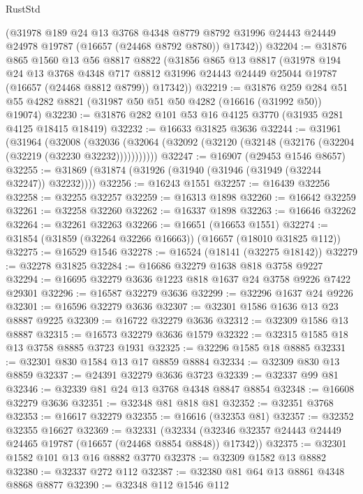 \begin{lexlean}{RustStd}
\begin{coremodule}
      (@31978
        @189
        @24
        @13
        @3768
        @4348
        @8779
        @8792
        @31996
        @24443
        @24449
        @24978
        @19787
        (@16657 (@24468 @8792 @8780))
        @17342))
@32204 := @31876
    @865
    @1560
    @13
    @56
    @8817
    @8822
    (@31856
      @865
      @13
      @8817
      (@31978
        @194
        @24
        @13
        @3768
        @4348
        @717
        @8812
        @31996
        @24443
        @24449
        @25044
        @19787
        (@16657 (@24468 @8812 @8799))
        @17342))
@32219 := @31876
    @259
    @284
    @51
    @55
    @4282
    @8821
    (@31987 @50 @51 @50 @4282 (@16616 (@31992 @50)) @19074)
@32230 := @31876 @282 @101 @53 @16 @4125 @3770 (@31935 @281 @4125 @18415 @18419)
@32232 := @16633 @31825 @3636
@32244 := @31961
    (@31964
      (@32008
        (@32036 (@32064 (@32092 (@32120 (@32148 (@32176 (@32204 (@32219 (@32230 @32232)))))))))))
@32247 := @16907 (@29453 @1546 @8657)
@32255 := @31869 (@31874 (@31926 (@31940 (@31946 (@31949 (@32244 @32247)) @32232))))
@32256 := @16243 @1551
@32257 := @16439 @32256
@32258 := @32255 @32257
@32259 := @16313 @1898
@32260 := @16642 @32259
@32261 := @32258 @32260
@32262 := @16337 @1898
@32263 := @16646 @32262
@32264 := @32261 @32263
@32266 := @16651 (@16653 @1551)
@32274 := @31854 (@31859 (@32264 @32266 @16663)) (@16657 (@18010 @31825 @112))
@32275 := @16529 @1546
@32278 := @16524 (@18141 (@32275 @18142))
@32279 := @32278 @31825
@32284 := @16686 @32279 @1638 @818 @3758 @9227
@32294 := @16695 @32279 @3636 @1223 @818 @1637 @24 @3758 @9226 @7422 @29301
@32296 := @16587 @32279 @3636
@32299 := @32296 @1637 @24 @9226
@32301 := @16596 @32279 @3636
@32307 := @32301 @1586 @1636 @13 @23 @8887 @9225
@32309 := @16722 @32279 @3636
@32312 := @32309 @1586 @13 @8887
@32315 := @16573 @32279 @3636 @1579
@32322 := @32315 @1585 @18 @13 @3758 @8885 @3723 @1931
@32325 := @32296 @1585 @18 @8885
@32331 := @32301 @830 @1584 @13 @17 @8859 @8884
@32334 := @32309 @830 @13 @8859
@32337 := @24391 @32279 @3636 @3723
@32339 := @32337 @99 @81
@32346 := @32339 @81 @24 @13 @3768 @4348 @8847 @8854
@32348 := @16608 @32279 @3636
@32351 := @32348 @81 @818 @81
@32352 := @32351 @3768
@32353 := @16617 @32279
@32355 := @16616 (@32353 @81)
@32357 := @32352 @32355 @16627
@32369 := @32331
    (@32334 (@32346 @32357 @24443 @24449 @24465 @19787 (@16657 (@24468 @8854 @8848)) @17342))
@32375 := @32301 @1582 @101 @13 @16 @8882 @3770
@32378 := @32309 @1582 @13 @8882
@32380 := @32337 @272 @112
@32387 := @32380 @81 @64 @13 @8861 @4348 @8868 @8877
@32390 := @32348 @112 @1546 @112

\end{coremodule}
\end{lexlean}
